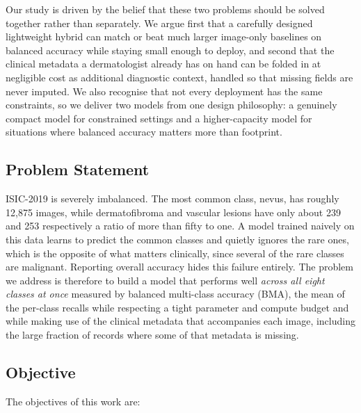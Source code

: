 Our study is driven by the belief that these two problems should be solved
together rather than separately. We argue first that a carefully designed
lightweight hybrid can match or beat much larger image-only baselines on
balanced accuracy while staying small enough to deploy, and second that the
clinical metadata a dermatologist already has on hand can be folded in at
negligible cost as additional diagnostic context, handled so that missing
fields are never imputed. We
also recognise that not every deployment has the same constraints, so we deliver
two models from one design philosophy: a genuinely compact model for
constrained settings and a higher-capacity model for situations where balanced
accuracy matters more than footprint.

\subsection{Problem Statement}

ISIC-2019 is severely imbalanced. The most common class, nevus, has roughly
12{,}875 images, while dermatofibroma and vascular lesions have only about 239
and 253 respectively a ratio of more than fifty to one. A model trained
naively on this data learns to predict the common classes and quietly ignores
the rare ones, which is the opposite of what matters clinically, since several
of the rare classes are malignant. Reporting overall accuracy hides this failure
entirely. The problem we address is therefore to build a model that performs
well \emph{across all eight classes at once} measured by balanced
multi-class accuracy (BMA), the mean of the per-class recalls while
respecting a tight parameter and compute budget and while making use of the
clinical metadata that accompanies each image, including the large fraction of
records where some of that metadata is missing.

\subsection{Objective}

The objectives of this work are:

